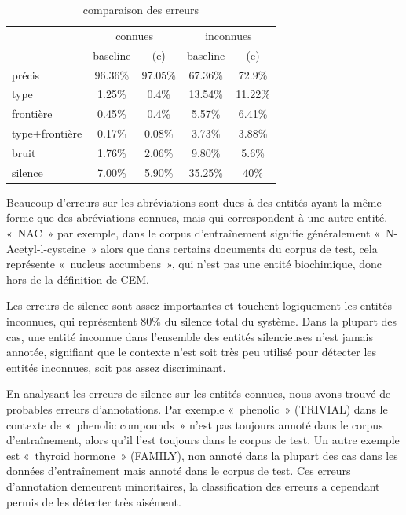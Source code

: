 \documentclass[12pt,a4paper,times,twoside,openright]{report}
\begin{document}
\begin{table}[ht!]
\centering
\begin{tabular}{|l|cc|cc|}
\cline{2-5}
\multicolumn{1}{l|}{} & \multicolumn{2}{c|}{connues} & \multicolumn{2}{c|}{inconnues}    \\
\multicolumn{1}{l|}{} & baseline & (e)                & baseline  & (e)   \\
\hline
précis                & 96.36\%  & 97.05\%            & 67.36\%   & 72.9\% \\
\hline
type                  &  1.25\%  & 0.4\%              & 13.54\%   & 11.22\% \\
frontière             &  0.45\%  & 0.4\%              & 5.57\%    & 6.41\% \\
type+frontière        &  0.17\%  & 0.08\%             & 3.73\%    & 3.88\% \\
bruit                 &  1.76\%  & 2.06\%             & 9.80\%    & 5.6\% \\
\hline
silence               &  7.00\%  & 5.90\%             & 35.25\%   & 40\% \\
\hline
\end{tabular}
\caption{comparaison des erreurs}
\label{tab:error-comparison}
\end{table}

Beaucoup d'erreurs sur les abréviations sont dues à des entités ayant la même forme que des abréviations connues, mais qui correspondent à une autre entité. «~NAC~» par exemple, dans le corpus d'entraînement signifie généralement «\ N-Acetyl-l-cysteine\ » alors que dans certains documents du corpus de test, cela représente «\ nucleus accumbens\ », qui n'est pas une entité biochimique, donc hors de la définition de CEM.

Les erreurs de silence sont assez importantes et touchent logiquement les entités inconnues, qui représentent 80\% du silence total du système. Dans la plupart des cas, une entité inconnue dans l'ensemble des entités silencieuses n'est jamais annotée, signifiant que le contexte n'est soit très peu utilisé pour détecter les entités inconnues, soit pas assez discriminant.

En analysant les erreurs de silence sur les entités connues, nous avons trouvé de probables erreurs d'annotations. Par exemple «\ phenolic\ » (TRIVIAL) dans le contexte de «\ phenolic compounds\ » n'est pas toujours annoté dans le corpus d'entraînement, alors qu'il l'est toujours dans le corpus de test. Un autre exemple est «\ thyroid hormone\ » (FAMILY), non annoté dans la plupart des cas dans les données  d'entraînement mais annoté dans le corpus de test. Ces erreurs d'annotation demeurent minoritaires, la classification des erreurs a cependant permis de les détecter très aisément.
\end{document}
